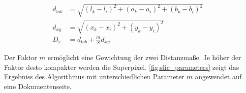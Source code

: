 \begin{align}
    d_{lab} &= \sqrt{ \left( l_k - l_i \right)^2 + \left( a_k - a_i \right)^2 + \left( b_k - b_i \right)^2 }\\
    d_{xy}  &= \sqrt{ \left( x_k - x_i \right)^2 + \left(y_k - y_i \right)^2 }\\
    D_{s}   &= d_{lab} + \frac{m}{S} d_{xy}
\end{align}

Der Faktor \(m\) ermöglicht eine Gewichtung der zwei Distanzmaße. 
Je höher der Faktor desto kompakter werden die Superpixel. \cref{fig:slic_parameters}
zeigt das Ergebniss des Algorithmus mit unterschiedlichen Parameter  \(m\)
angewendet auf eine Dokumentenseite.
